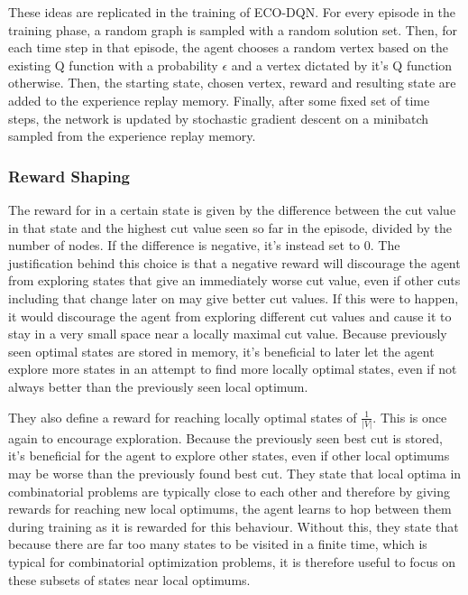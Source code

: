 \documentclass{article}
\begin{document}
These ideas are replicated in the training of ECO-DQN. For every episode in the training phase, a random graph is sampled with a random solution set. Then, for each time step in that episode, the agent chooses a random vertex based on the existing Q function with a probability $\epsilon$ and a vertex dictated by it's Q function otherwise. Then, the starting state, chosen vertex, reward and resulting state are added to the experience replay memory. Finally, after some fixed set of time steps, the network is updated by stochastic gradient descent on a minibatch sampled from the experience replay memory.

\subsubsection{Reward Shaping}

The reward for in a certain state is given by the difference between the cut value in that state and the highest cut value seen so far in the episode, divided by the number of nodes. If the difference is negative, it's instead set to 0. The justification behind this choice is that a negative reward will discourage the agent from exploring states that give an immediately worse cut value, even if other cuts including that change later on may give better cut values. If this were to happen, it would discourage the agent from exploring different cut values and cause it to stay in a very small space near a locally maximal cut value. Because previously seen optimal states are stored in memory, it's beneficial to later let the agent explore more states in an attempt to find more locally optimal states, even if not always better than the previously seen local optimum.

They also define a reward for reaching locally optimal states of $\frac{1}{|V|}$. This is once again to encourage exploration. Because the previously seen best cut is stored, it's beneficial for the agent to explore other states, even if other local optimums may be worse than the previously found best cut. They state that local optima in combinatorial problems are typically close to each other and therefore by giving rewards for reaching new local optimums, the agent learns to hop between them during training as it is rewarded for this behaviour. Without this, they state that because there are far too many states to be visited in a finite time, which is typical for combinatorial optimization problems, it is therefore useful to focus on these subsets of states near local optimums.
\end{document}
